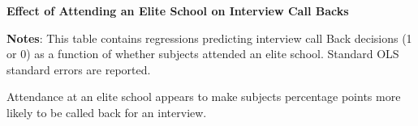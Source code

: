 \documentclass[11pt]{article}
\begin{document}
\begin{table}[htbp]
\caption{\textbf{Effect of Attending an Elite School on Interview Call Backs}
\label{tab:EngApproach}}
\flushleft
    
    \flushleft
    \begin{footnotesize}
    \textbf{Notes}: This table contains regressions predicting interview call Back decisions (1 or 0) as a function of whether subjects attended an elite school. Standard OLS standard errors are reported.  
    \end{footnotesize}
\end{table}

Attendance at an elite school appears to make subjects  percentage points more likely to be called back for an interview.
\end{document}
